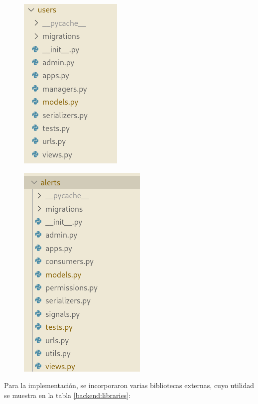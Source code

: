 \begin{figure}[H]
\centering
\begin{minipage}{.5\textwidth}
  \centering
  \includegraphics[width=.4\linewidth]{./Figures/backend-folder1.png}
  \label{backend:folder1}
\end{minipage}%
\begin{minipage}{.5\textwidth}
  \centering
  \includegraphics[width=.4\linewidth]{./Figures/backend-folder2.png}
  \label{backend:folder2}
\end{minipage}
\end{figure}

Para la implementación, se incorporaron varias bibliotecas externas, cuyo utilidad se muestra en la tabla \ref{backend:libraries}:

